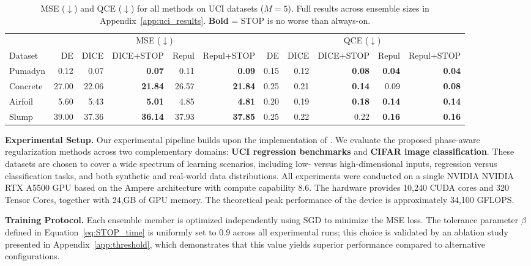 \documentclass[sigconf]{acmart}
\begin{document}
\begin{table}[t]
\centering
\caption{MSE ($\downarrow$) and QCE ($\downarrow$) for all methods on UCI datasets ($M=5$). Full results across ensemble sizes in Appendix~\ref{app:uci_results}. \textbf{Bold} = STOP is no worse than always-on.}
\label{tab:uci_perf}
\small
\setlength{\tabcolsep}{4pt}
\begin{tabular}{l rrrrr rrrrr}
\toprule
& \multicolumn{5}{c}{MSE ($\downarrow$)} & \multicolumn{5}{c}{QCE ($\downarrow$)} \\
\cmidrule(lr){2-6} \cmidrule(lr){7-11}
Dataset & DE & DICE & DICE+STOP & Repul & Repul+STOP & DE & DICE & DICE+STOP & Repul & Repul+STOP \\
\midrule
Pumadyn & 0.12 & 0.07 & \textbf{0.07} & 0.11 & \textbf{0.09} & 0.15 & 0.12 & \textbf{0.08} & \textbf{0.04} & \textbf{0.04} \\
Concrete & 27.00 & 22.06 & \textbf{21.84} & 26.57 & \textbf{21.84} & 0.25 & 0.21 & \textbf{0.14} & 0.09 & \textbf{0.08} \\
Airfoil & 5.60 & 5.43 & \textbf{5.01} & 4.85 & \textbf{4.81} & 0.20 & 0.19 & \textbf{0.18} & \textbf{0.14} & \textbf{0.14} \\
Slump & 39.00 & 37.36 & \textbf{36.14} & 37.93 & \textbf{37.85} & 0.25 & 0.22 & 0.22 & \textbf{0.16} & \textbf{0.16} \\
\bottomrule
\end{tabular}
\end{table}

\textbf{Experimental Setup.}
Our experimental pipeline builds upon the implementation of \citep{seligmann2024beyond}. We evaluate the proposed phase-aware regularization methods across two complementary domains: \textbf{UCI regression benchmarks} and \textbf{CIFAR image classification}. These datasets are chosen to cover a wide spectrum of learning scenarios, including low- versus high-dimensional inputs, regression versus classification tasks, and both synthetic and real-world data distributions. All experiments were conducted on a single NVIDIA NVIDIA RTX A5500 GPU based on the Ampere architecture with compute capability 8.6. The hardware provides 10,240 CUDA cores and 320 Tensor Cores, together with 24,GB of GPU memory. The theoretical peak performance of the device is approximately 34,100 GFLOPS.

\textbf{Training Protocol.}
Each ensemble member is optimized independently using SGD to minimize the MSE loss. The tolerance parameter $\beta$ defined in Equation~\ref{eq:STOP_time} is uniformly set to $0.9$ across all experimental runs; this choice is validated by an ablation study presented in Appendix~\ref{app:threshold}, which demonstrates that this value yields superior performance compared to alternative configurations. 
\end{document}
